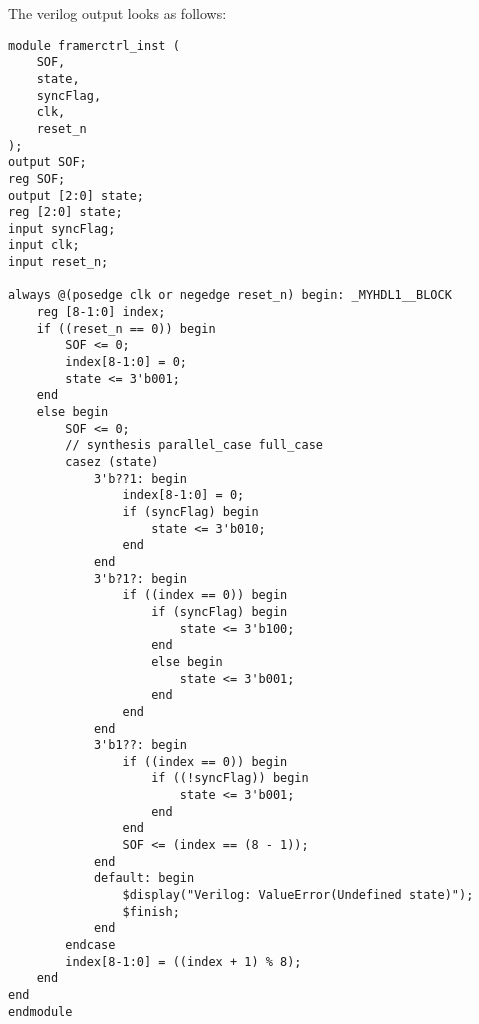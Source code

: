 \documentclass{howto}
\begin{document}
The verilog output looks as follows:

\begin{verbatim}
module framerctrl_inst (
    SOF,
    state,
    syncFlag,
    clk,
    reset_n 
);
output SOF;
reg SOF;
output [2:0] state;
reg [2:0] state;
input syncFlag;
input clk;
input reset_n;

always @(posedge clk or negedge reset_n) begin: _MYHDL1__BLOCK
    reg [8-1:0] index;
    if ((reset_n == 0)) begin
        SOF <= 0;
        index[8-1:0] = 0;
        state <= 3'b001;
    end
    else begin
        SOF <= 0;
        // synthesis parallel_case full_case
        casez (state)
            3'b??1: begin
                index[8-1:0] = 0;
                if (syncFlag) begin
                    state <= 3'b010;
                end
            end
            3'b?1?: begin
                if ((index == 0)) begin
                    if (syncFlag) begin
                        state <= 3'b100;
                    end
                    else begin
                        state <= 3'b001;
                    end
                end
            end
            3'b1??: begin
                if ((index == 0)) begin
                    if ((!syncFlag)) begin
                        state <= 3'b001;
                    end
                end
                SOF <= (index == (8 - 1));
            end
            default: begin
                $display("Verilog: ValueError(Undefined state)");
                $finish;
            end
        endcase
        index[8-1:0] = ((index + 1) % 8);
    end
end
endmodule
\end{verbatim}
\end{document}
